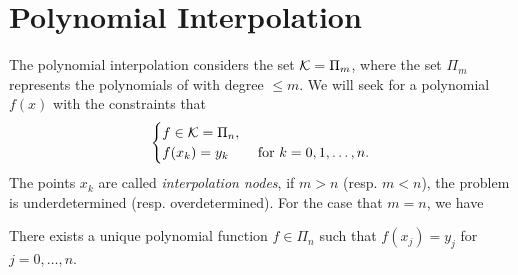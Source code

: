 \section{Polynomial Interpolation}
\label{Sec: 2-Pol-Int}
The polynomial interpolation considers the set $\mathcal K = \Pi_m$, where the set $\Pi_m$ represents the polynomials of with degree $ \le m$. We will seek for a polynomial $f(x)$ with the constraints that
\begin{equation}\nonumber
    \begin{cases}
        f\in \mathcal K = \Pi_n,&\\
        f(x_k) = y_k &\text{ for } k = 0, 1,\dots, n.
    \end{cases}
\end{equation}
The points $x_k$ are called \emph{interpolation nodes}, if $m > n$ (resp. $m < n$), the problem is underdetermined (resp. overdetermined). For the case that $ m = n$, we have
\begin{theorem}
\label{Thm: 2-Uni-Exi}
    There exists a unique polynomial function $f\in \Pi_n$ such that $f(x_j) = y_j$ for $j=0,\dots, n$.
\end{theorem}
